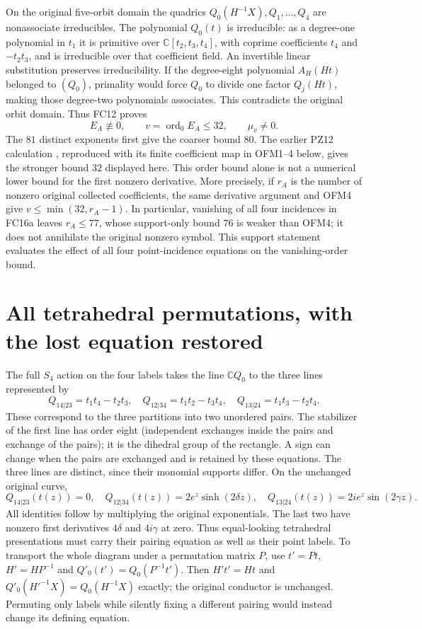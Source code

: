 \documentclass[11pt]{article}
\newcommand{\C}{\mathbb C}
\newcommand{\ord}{\operatorname{ord}}
\begin{document}
On the original five-orbit domain the quadrics $Q_0(H^{-1}X),Q_1,\ldots,Q_4$
are nonassociate irreducibles. The polynomial $Q_0(t)$ is irreducible:
as a degree-one polynomial in $t_1$ it is primitive over
$\C[t_2,t_3,t_4]$, with coprime coefficients $t_4$ and $-t_2t_3$,
and is irreducible over that coefficient field. An invertible linear
substitution preserves irreducibility. If the degree-eight polynomial
$A_H(Ht)$ belonged to $(Q_0)$, primality would force $Q_0$ to divide
one factor $Q_j(Ht)$, making those degree-two polynomials associates.
This contradicts the original orbit domain. Thus FC12 proves
\[
 E_A\not\equiv0,\qquad
 v=\ord_0E_A\le32,\qquad\mu_v\ne0.
 \tag{FC17}
\]
The $81$ distinct exponents first give the coarser bound $80$.
The earlier PZ12 calculation \cite{PeriodZeroOriginal}, reproduced
with its finite coefficient map in OFM1--4 below, gives the stronger
bound $32$ displayed here. This order bound alone is not a numerical lower bound for the
first nonzero derivative.
More precisely, if $r_A$ is the number of nonzero original collected
coefficients, the same derivative argument and OFM4 give $v\le\min(32,r_A-1)$.
In particular, vanishing of all four incidences in FC16a leaves
$r_A\le77$, whose support-only bound $76$ is weaker than OFM4; it does not annihilate the original
nonzero symbol. This support statement evaluates the effect of all four
point-incidence equations on the vanishing-order bound.

\section{All tetrahedral permutations, with the lost equation restored}
The full $S_4$ action on the four labels takes the line $\C Q_0$ to
the three lines represented by
\[
 Q_{14|23}=t_1t_4-t_2t_3,\quad
 Q_{12|34}=t_1t_2-t_3t_4,\quad
 Q_{13|24}=t_1t_3-t_2t_4.
 \tag{FC18}
\]
These correspond to the three partitions into two unordered pairs.
The stabilizer of the first line has order eight (independent exchanges
inside the pairs and exchange of the pairs); it is the dihedral group
of the rectangle. A sign can change when the pairs are exchanged and
is retained by these equations. The three lines are distinct, since
their monomial supports differ. On the unchanged original curve,
\[
 Q_{14|23}(t(z))=0,\quad
 Q_{12|34}(t(z))=2e^z\sinh(2\delta z),\quad
 Q_{13|24}(t(z))=2ie^z\sin(2\gamma z).
 \tag{FC19}
\]
All identities follow by multiplying the original exponentials. The
last two have nonzero first derivatives $4\delta$ and $4i\gamma$ at zero.
Thus equal-looking tetrahedral presentations must carry their pairing
equation as well as their point labels. To transport the whole diagram
under a permutation matrix $P$, use $t'=Pt$, $H'=HP^{-1}$ and
$Q'_0(t')=Q_0(P^{-1}t')$. Then $H't'=Ht$ and
$Q'_0(H'^{-1}X)=Q_0(H^{-1}X)$ exactly; the original conductor is unchanged.
Permuting only labels while silently fixing a different pairing would
instead change its defining equation.
\end{document}
